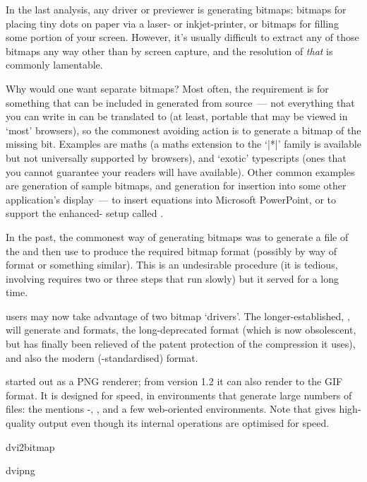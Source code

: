 In the last analysis, any  driver or previewer is generating
bitmaps: bitmaps for placing tiny dots on paper via a laser- or
inkjet-printer, or bitmaps for filling some portion of your screen.
However, it's usually difficult to extract any of those bitmaps any
way other than by screen capture, and the resolution of \emph{that} is
commonly lamentable.

Why would one want separate bitmaps?  Most often, the requirement is for
something that can be included in  generated from \AllTeX{}
source~--- not everything that you can write in \AllTeX{} can be
translated to  (at least, portable  that may be
viewed in `most' browsers), so the commonest avoiding action is to
generate a bitmap of the missing bit.  Examples are maths (a maths
extension to the `|*|' family is available but not
universally supported by browsers), and `exotic' typescripts (ones
that you cannot guarantee your readers will have available).  Other
common examples are generation of 
sample bitmaps, and generation for insertion into some other
application's display~--- to insert equations into Microsoft
PowerPoint, or to support the enhanced- setup called
.

In the past, the commonest way of generating bitmaps was to generate a
\PS{} file of the  and then use
\href{http://www.ghostscript.com/}{} to
produce the required bitmap format (possibly by way of 
format or something similar).  This is an undesirable procedure (it is
tedious, involving requires two or three steps that run slowly) but it
served for a long time.

\AllTeX{} users may now take advantage of two bitmap `drivers'.  The
longer-established, , will generate  and
 formats, the long-deprecated  format (which is
now obsolescent, but has finally been relieved of the patent
protection of the  compression it uses), and also
the modern (-standardised)  format.

 started out as a PNG renderer; from version 1.2 it can also
render to the GIF format. It is designed for speed, in environments that
generate large numbers of  files: the  mentions
-, , and a few
web-oriented environments. Note that  gives
high-quality output even though its internal operations are optimised
for speed.
\begin{ctanrefs}
\item[dvi2bitmap]
\item[dvipng]
\end{ctanrefs}
